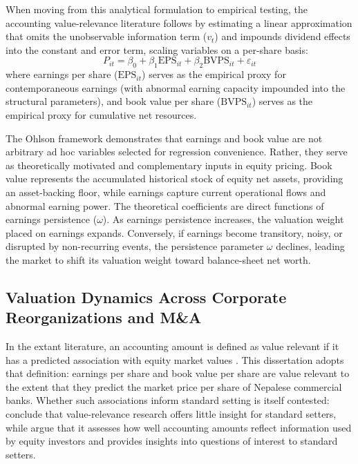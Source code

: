 \begin{enumerate}
When moving from this analytical formulation to empirical testing, the accounting value-relevance literature follows \citet{collins1997} by estimating a linear approximation that omits the unobservable information term ($v_t$) and impounds dividend effects into the constant and error term, scaling variables on a per-share basis:
\begin{equation}
P_{it} = \beta_0 + \beta_1 \text{EPS}_{it} + \beta_2 \text{BVPS}_{it} + \varepsilon_{it}
\end{equation}
where earnings per share ($\text{EPS}_{it}$) serves as the empirical proxy for contemporaneous earnings (with abnormal earning capacity impounded into the structural parameters), and book value per share ($\text{BVPS}_{it}$) serves as the empirical proxy for cumulative net resources.
\end{enumerate}

The Ohlson framework demonstrates that earnings and book value are not arbitrary ad hoc variables selected for regression convenience. Rather, they serve as theoretically motivated and complementary inputs in equity pricing. Book value represents the accumulated historical stock of equity net assets, providing an asset-backing floor, while earnings capture current operational flows and abnormal earning power. The theoretical coefficients are direct functions of earnings persistence ($\omega$). As earnings persistence increases, the valuation weight placed on earnings expands. Conversely, if earnings become transitory, noisy, or disrupted by non-recurring events, the persistence parameter $\omega$ declines, leading the market to shift its valuation weight toward balance-sheet net worth.

\subsection{Valuation Dynamics Across Corporate Reorganizations and M\&A}
\label{subsec:ma_valuation}

In the extant literature, an accounting amount is defined as value relevant if it has a predicted association with equity market values \citep{barth2001}. This dissertation adopts that definition: earnings per share and book value per share are value relevant to the extent that they predict the market price per share of Nepalese commercial banks. Whether such associations inform standard setting is itself contested: \citet{holthausen2001} conclude that value-relevance research offers little insight for standard setters, while \citet{barth2001} argue that it assesses how well accounting amounts reflect information used by equity investors and provides insights into questions of interest to standard setters.

